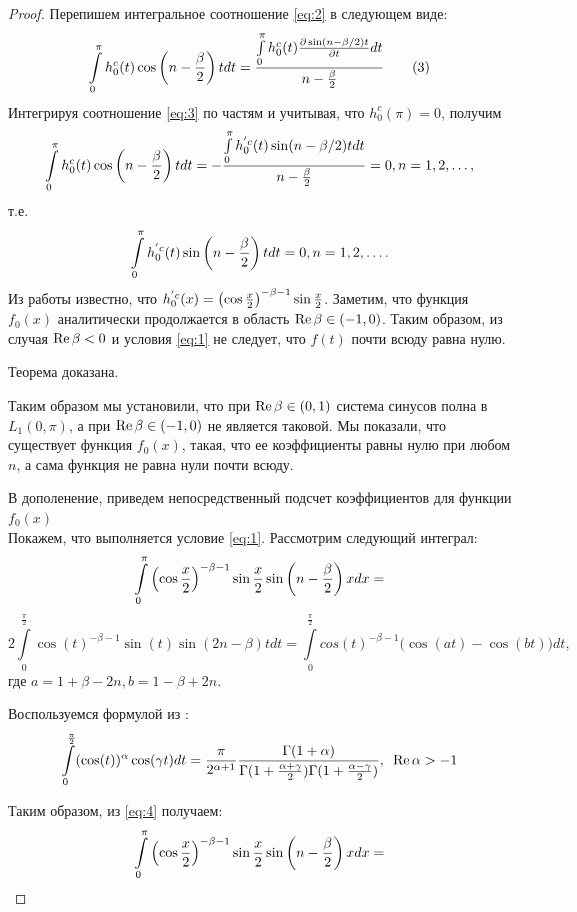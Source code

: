 \documentclass[oneside, final, 14pt]{extreport}
\begin{document}
\begin{proof}
		Перепишем интегральное соотношение \eqref{eq:2} в следующем виде:
		\begin{equation}
			\int\limits_0^\pi h^c_0(t)\cos\left(n - \frac{\beta}{2}\right)tdt = 
			\frac{\int\limits_0^\pi h^c_0(t)\frac{\partial\sin(n - \beta / 2)t}{\partial t}dt}{n - \frac{\beta}{2}}
			\tag{3}\label{eq:3}
		\end{equation}
		Интегрируя соотношение \eqref{eq:3} по частям и учитывая, что $h^c_0(\pi) = 0$, получим
		$$
			\int\limits_0^\pi h^c_0(t)\cos\left(n - \frac{\beta}{2}\right)tdt = 
			-\frac{\int\limits_0^\pi h^{'c}_0(t)\sin(n - \beta / 2)tdt}{n - \frac{\beta}{2}} = 0, n = 1,2, \ldots,
		$$
		т.е.
		$$
			\int\limits_0^\pi h^{'c}_0(t)\sin\left(n - \frac{\beta}{2}\right)tdt = 0, n = 1, 2, \ldots.
		$$
		Из работы \cite{moiseev-2018} известно, что $h^{'c}_0(x) = \left(\cos\frac{x}{2}\right)^{-\beta-1}\sin\frac{x}{2}$. 
		Заметим, что функция $f_0(x)$ аналитически продолжается в область $\operatorname{Re}\beta \in (-1, 0)$. 
		Таким образом, из случая $\operatorname{Re}{\beta} < 0$ и условия \eqref{eq:1} не следует, что $f(t)$ почти всюду равна нулю.
		
		Теорема доказана.
		
		\bigskip
		Таким образом мы установили, что при $\operatorname{Re}{\beta} \in (0, 1)$ система синусов полна в $L_1(0, \pi)$, а при 
		$\operatorname{Re}{\beta} \in (-1, 0)$ не является таковой. Мы показали, что существует функция $f_0(x)$, такая, что ее 
		коэффициенты равны нулю при любом $n$, а сама функция не равна нули почти всюду.
		
		В дополенение, приведем непосредственный подсчет коэффициентов для функции $f_0(x)$\\
		Покажем, что выполняется условие \eqref{eq:1}. Рассмотрим следующий интеграл:
		$$
			\int\limits_0^\pi\left(\cos\frac{x}{2}\right)^{-\beta-1}\sin\frac{x}{2}\sin\left(n - \frac{\beta}{2}\right)xdx = 
		$$
		\begin{equation}
			2\int\limits_0^\frac{\pi}{2}\cos(t)^{-\beta - 1}\sin(t)\sin(2n - \beta)tdt 
			= \int\limits_0^\frac{\pi}{2}cos(t)^{-\beta-1}\bigl(\cos(at) - \cos(bt)\bigr)dt,	\tag{4} \label{eq:4}
		\end{equation}
		где $a =1 + \beta - 2n, b = 1 - \beta + 2n.$
		
		
		
		\bigskip
		
		Воспользуемся формулой из \cite{bateman}:
		$$
			\int\limits_0^\frac{\pi}{2}(\cos(t))^\alpha \cos(\gamma t)dt = \frac{\pi}{2^{\alpha + 1}}
			\frac{\Gamma(1 + \alpha)}{\Gamma(1 + \frac{\alpha + \gamma}{2})\Gamma(1 + \frac{\alpha - \gamma}{2})},
			\enspace\operatorname{Re}\alpha > -1
		$$
		
		Таким образом, из \eqref{eq:4} получаем:
		$$
			\int\limits_0^\pi\left(\cos\frac{x}{2}\right)^{-\beta-1}\sin\frac{x}{2}\sin\left(n - \frac{\beta}{2}\right)xdx = 
		$$
		

\end{proof}
\end{document}
